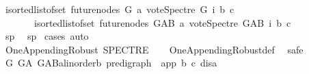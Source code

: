 \begin{isabellebody}
\ {\isachardoublequoteopen}{\isacharparenleft}{\kern0pt}{\isasymSum}i{\isasymleftarrow}sorted{\isacharunderscore}{\kern0pt}list{\isacharunderscore}{\kern0pt}of{\isacharunderscore}{\kern0pt}set\ {\isacharparenleft}{\kern0pt}future{\isacharunderscore}{\kern0pt}nodes\ G\ a{\isacharparenright}{\kern0pt}{\isachardot}{\kern0pt}\ vote{\isacharunderscore}{\kern0pt}Spectre\ G\ i\ b\ c{\isacharparenright}{\kern0pt}\isanewline
\ \ \ \ \ \ {\isasymle}\ {\isacharparenleft}{\kern0pt}{\isasymSum}i{\isasymleftarrow}sorted{\isacharunderscore}{\kern0pt}list{\isacharunderscore}{\kern0pt}of{\isacharunderscore}{\kern0pt}set\ {\isacharparenleft}{\kern0pt}future{\isacharunderscore}{\kern0pt}nodes\ G{\isacharunderscore}{\kern0pt}AB\ a{\isacharparenright}{\kern0pt}{\isachardot}{\kern0pt}\ vote{\isacharunderscore}{\kern0pt}Spectre\ G{\isacharunderscore}{\kern0pt}AB\ i\ b\ c{\isacharparenright}{\kern0pt}{\isachardoublequoteclose}\isanewline
\ \ \ \ \ \ \ \ \ \ \isamarkupfalse%
\ sp{}\ \isamarkupfalse%
\ sp{}\ \isamarkupfalse%
{\isacharparenleft}{\kern0pt}cases{\isacharcomma}{\kern0pt}\ auto{\isacharparenright}{\kern0pt}\isanewline
\ \ \ \ \ \ \ \ \isamarkupfalse%
\isanewline
\ \ \ \ \ \ \isamarkupfalse%
\isanewline
\ \ \ \ \isamarkupfalse%
\isanewline
\ \ \isamarkupfalse%
\isanewline
{}\isamarkupfalse%
%
\endisatagproof
{\isafoldproof}%
%
\isadelimproof
\isanewline
%
\endisadelimproof
\isanewline
{}\isamarkupfalse%
\ {\isachardoublequoteopen}One{\isacharunderscore}{\kern0pt}Appending{\isacharunderscore}{\kern0pt}Robust\ SPECTRE{\isachardoublequoteclose}\isanewline
%
\isadelimproof
\ \ %
\endisadelimproof
%
\isatagproof
{}\isamarkupfalse%
\ One{\isacharunderscore}{\kern0pt}Appending{\isacharunderscore}{\kern0pt}Robust{\isacharunderscore}{\kern0pt}def\ \isanewline
{}\isamarkupfalse%
\ safe\isanewline
\ \ \isamarkupfalse%
\ G\ G{\isacharunderscore}{\kern0pt}A\ G{\isacharunderscore}{\kern0pt}AB{\isacharcolon}{\kern0pt}{\isacharcolon}{\kern0pt}{\isachardoublequoteopen}{\isacharparenleft}{\kern0pt}{\isacharprime}{\kern0pt}a{\isacharcolon}{\kern0pt}{\isacharcolon}{\kern0pt}linorder{\isacharcomma}{\kern0pt}{\isacharprime}{\kern0pt}b{\isacharparenright}{\kern0pt}\ pre{\isacharunderscore}{\kern0pt}digraph{\isachardoublequoteclose}\ \ app\ b\ c\ dis{\isacharcolon}{\kern0pt}{\isacharcolon}{\kern0pt}{\isacharprime}{\kern0pt}a\isanewline
\ \ \isamarkupfalse%

\end{isabellebody}
